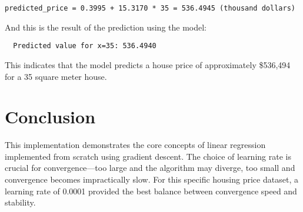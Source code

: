 \documentclass[hidelinks]{report}
\begin{document}
\begin{verbatim}
predicted_price = 0.3995 + 15.3170 * 35 = 536.4945 (thousand dollars)
\end{verbatim}

\noindent And this is the result of the prediction using the model:
\begin{verbatim}
  Predicted value for x=35: 536.4940
\end{verbatim}
\noindent This indicates that the model predicts a house price of approximately \$536,494 for a 35 square meter house.

\section{Conclusion}
\noindent This implementation demonstrates the core concepts of linear regression implemented from scratch using gradient descent. The choice of learning rate is crucial for convergence—too large and the algorithm may diverge, too small and convergence becomes impractically slow. For this specific housing price dataset, a learning rate of 0.0001 provided the best balance between convergence speed and stability.

\clearpage
{}
\end{document}
